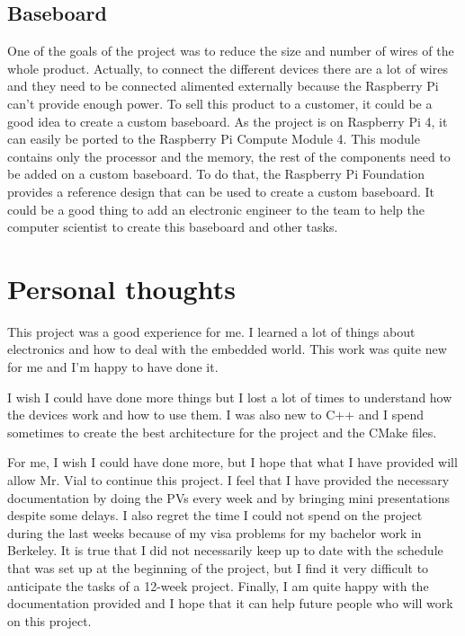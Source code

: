 \subsection{Baseboard}
\label{ch:conclusion:future:baseboard}

One of the goals of the project was to reduce the size and number of wires of the whole product.
Actually, to connect the different devices there are a lot of wires and they need to be connected alimented externally because the Raspberry Pi can't provide enough power.
To sell this product to a customer, it could be a good idea to create a custom baseboard.
As the project is on Raspberry Pi 4, it can easily be ported to the Raspberry Pi Compute Module 4.
This module contains only the processor and the memory, the rest of the components need to be added on a custom baseboard.
To do that, the Raspberry Pi Foundation provides a reference design that can be used to create a custom baseboard.
It could be a good thing to add an electronic engineer to the team to help the computer scientist to create this baseboard and other tasks.


\section{Personal thoughts}
\label{ch:conclusion:personal}

This project was a good experience for me.
I learned a lot of things about electronics and how to deal with the embedded world.
This work was quite new for me and I'm happy to have done it.

I wish I could have done more things but I lost a lot of times to understand how the devices work and how to use them.
I was also new to C++ and I spend sometimes to create the best architecture for the project and the CMake files.

For me, I wish I could have done more, but I hope that what I have provided will allow Mr. Vial to continue this project.
I feel that I have provided the necessary documentation by doing the PVs every week and by bringing mini presentations despite some delays.
I also regret the time I could not spend on the project during the last weeks because of my visa problems for my bachelor work in Berkeley.
It is true that I did not necessarily keep up to date with the schedule that was set up at the beginning of the project, but I find it very difficult to anticipate the tasks of a 12-week project.
Finally, I am quite happy with the documentation provided and I hope that it can help future people who will work on this project.
